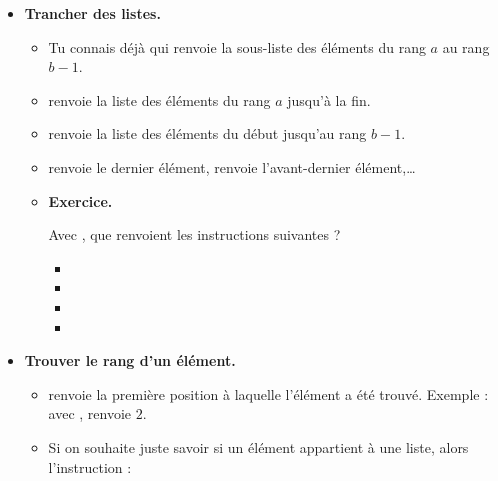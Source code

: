 \documentclass[11pt,class=report,crop=false]{standalone}
\begin{document}
\begin{cours}
\sauteligne
\begin{itemize}
  \item \textbf{Trancher des listes.}
  

  \begin{itemize}
    \item Tu connais déjà  qui renvoie la sous-liste des éléments du rang $a$ au rang $b-1$.
    
    \item {} renvoie la liste des éléments du rang $a$ jusqu'à la fin.
      
    \item {} renvoie la liste des éléments du début jusqu'au rang $b-1$.
    
    \item {} renvoie le dernier élément,  renvoie l'avant-dernier élément,\ldots

  \item \textbf{Exercice.} 
  
  Avec , 
que renvoient les instructions suivantes ?


  
\begin{itemize}
  \item {}
  \item {}
  \item {}
  \item {}
\end{itemize}

   \end{itemize} 
   
   

  \item \textbf{Trouver le rang d'un élément.} 

\begin{itemize}

    \item  {}
    renvoie la première position à laquelle l'élément a été trouvé. Exemple : avec ,
    renvoie $2$.

  \item   {} 
  Si on souhaite juste savoir si un élément appartient à une liste, alors l'instruction :
  

\end{itemize}
\end{itemize}
\end{cours}
\end{document}
